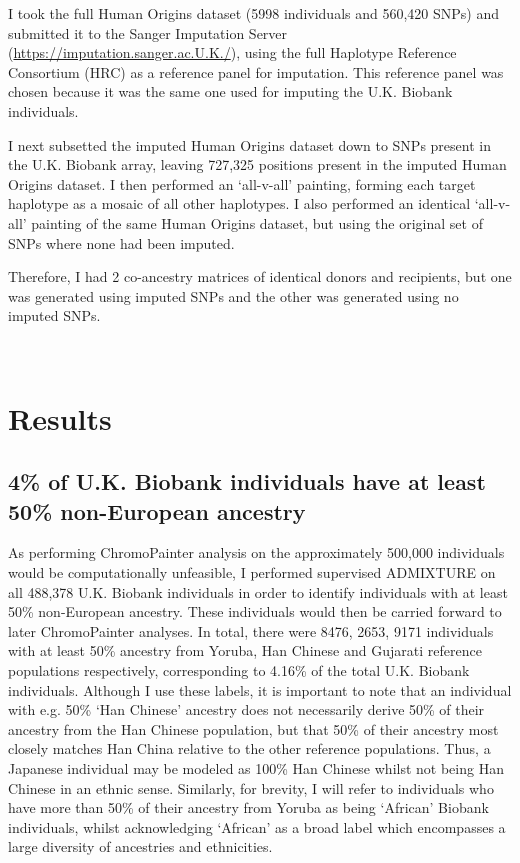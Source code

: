 I took the full Human Origins dataset (5998 individuals and 560,420 SNPs) and submitted it to the Sanger Imputation Server (\url{https://imputation.sanger.ac.U.K./}), using the full Haplotype Reference Consortium (HRC) as a reference panel for imputation. This reference panel was chosen because it was the same one used for imputing the U.K. Biobank individuals.

I next subsetted the imputed Human Origins dataset down to SNPs present in the U.K. Biobank array, leaving 727,325 positions present in the imputed Human Origins dataset. I then performed an `all-v-all' painting, forming each target haplotype as a mosaic of all other haplotypes. I also performed an identical `all-v-all' painting of the same Human Origins dataset, but using the original set of SNPs where none had been imputed. 

Therefore, I had 2 co-ancestry matrices of identical donors and recipients, but one was generated using imputed SNPs and the other was generated using no imputed SNPs. 

\

\section{Results}

\subsection{4\% of U.K. Biobank individuals have at least 50\% non-European ancestry}

As performing ChromoPainter analysis on the approximately 500,000 individuals would be computationally unfeasible, I performed supervised ADMIXTURE on all 488,378 U.K. Biobank individuals in order to identify individuals with at least 50\% non-European ancestry. These individuals would then be carried forward to later ChromoPainter analyses. In total, there were 8476, 2653, 9171 individuals with at least 50\% ancestry from Yoruba, Han Chinese and Gujarati reference populations respectively, corresponding to 4.16\% of the total U.K. Biobank individuals. Although I use these labels, it is important to note that an individual with e.g. 50\% `Han Chinese' ancestry does not necessarily derive 50\% of their ancestry from the Han Chinese population, but that 50\% of their ancestry most closely matches Han China relative to the other reference populations. Thus, a Japanese individual may be modeled as 100\% Han Chinese whilst not being Han Chinese in an ethnic sense. Similarly, for brevity, I will refer to individuals who have more than 50\% of their ancestry from Yoruba as being `African' Biobank individuals, whilst acknowledging `African' as a broad label which encompasses a large diversity of ancestries and ethnicities.  

